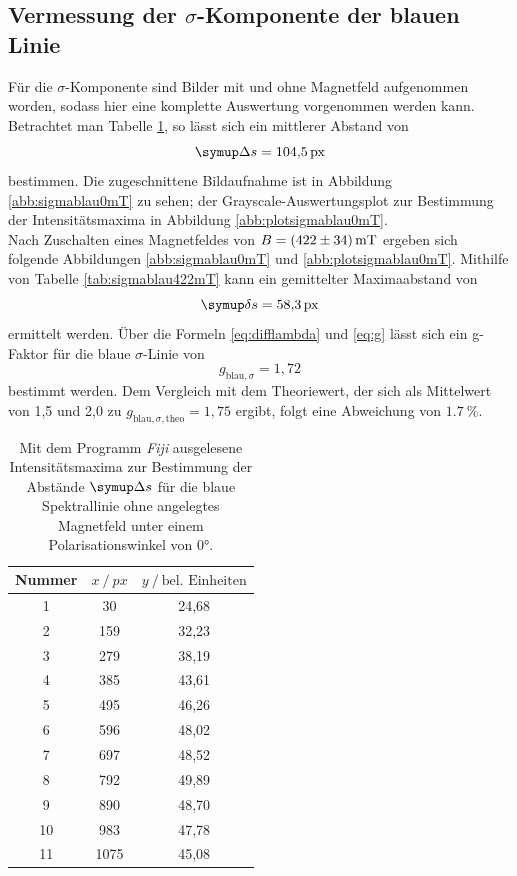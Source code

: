 \subsection{Vermessung der \texorpdfstring{$\sigma$}{sigma}-Komponente der blauen Linie}
Für die $\sigma$-Komponente sind Bilder mit und ohne Magnetfeld aufgenommen worden, sodass hier eine komplette Auswertung vorgenommen werden kann. Betrachtet man Tabelle \ref{tab:sigmablau0mT}, so lässt sich ein mittlerer Abstand von
\begin{equation}
  \Deltaup s=\SI{104,5}{px}
\end{equation}
bestimmen. Die zugeschnittene Bildaufnahme ist in Abbildung \ref{abb:sigmablau0mT} zu sehen; der Grayscale-Auswertungsplot zur Bestimmung der Intensitätsmaxima in Abbildung \ref{abb:plotsigmablau0mT}.\\
Nach Zuschalten eines Magnetfeldes von $B=\SI{422\pm34}{\milli\tesla}$ ergeben sich folgende Abbildungen \ref{abb:sigmablau0mT} und \ref{abb:plotsigmablau0mT}. Mithilfe von Tabelle \ref{tab:sigmablau422mT} kann ein gemittelter Maximaabstand von
\begin{equation}
\deltaup s=\SI{58,3}{px}
\end{equation}
ermittelt werden.
Über die Formeln \eqref{eq:difflambda} und \eqref{eq:g} lässt sich ein g-Faktor für die blaue $\sigma$-Linie von
\begin{equation}
 g_{\text{blau},\sigma}=1,72
\end{equation}
bestimmt werden. Dem Vergleich mit dem Theoriewert, der sich als Mittelwert von 1,5 und 2,0 zu $g_{\text{blau},\sigma,\text{theo}}=1,75$ ergibt, folgt eine Abweichung von $\SI{1,7}{\%}$.

\begin{table}[H]
  \centering
  \caption{Mit dem Programm \textit{Fiji} \cite{Fiji} ausgelesene Intensitätsmaxima zur Bestimmung der Abstände $\Deltaup s$ für die blaue Spektrallinie ohne angelegtes Magnetfeld unter einem Polarisationswinkel von $0°$.}
  \label{tab:sigmablau0mT}
  \begin{tabular}{c|cc}
    \toprule
    {Nummer} & {$x \:/\: \si{px}$} & {$y \:/\: \text{bel. Einheiten}$}\\
    \midrule
 1 &   30  &	 24,68 \\
 2 &   159  &	 32,23 \\
 3 &  279  &	 38,19 \\
 4 &  385  &	 43,61 \\
 5 &  495  &	 46,26 \\
 6 &  596  &	 48,02 \\
 7 &  697  &	 48,52 \\
 8 &  792  &	 49,89 \\
 9 &  890  &   48,70 \\
10 &  983  &	 47,78 \\
11 &  1075  &	 45,08 \\
  \end{tabular}
\end{table}

